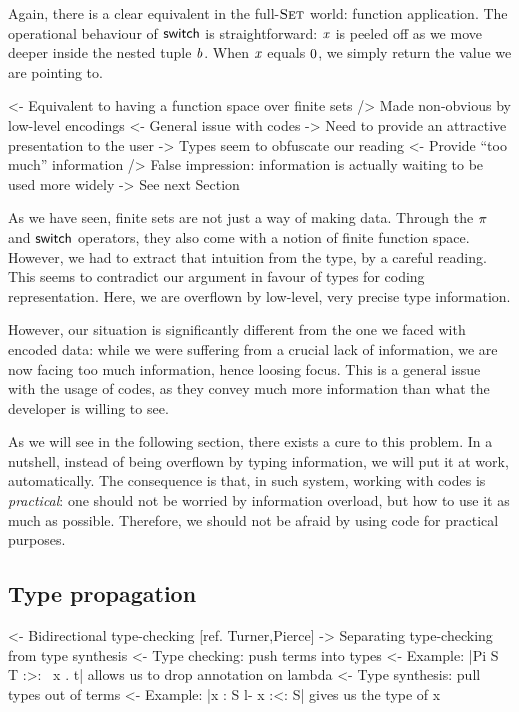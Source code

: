 Again, there is a clear equivalent in the full-$\Set$ world: function
application. The operational behaviour of $\F{switch}$ is
straightforward: $\V{x}$ is peeled off as we move deeper inside the nested
tuple $\V{b}$. When $\V{x}$ equals $\Ze$, we simply return the value we are
pointing to.

\begin{wstructure}
<- Equivalent to having a function space over finite sets
    /> Made non-obvious by low-level encodings
        <- General issue with codes
             -> Need to provide an attractive presentation to the user
    -> Types seem to obfuscate our reading
        <- Provide ``too much'' information
        /> False impression: information is actually waiting to be used more widely
        -> See next Section
\end{wstructure}

As we have seen, finite sets are not just a way of making
data. Through the $\spi{}{}$ and $\F{switch}$ operators, they also
come with a notion of finite function space. However, we had to
extract that intuition from the type, by a careful reading. This seems
to contradict our argument in favour of types for coding
representation. Here, we are overflown by low-level, very precise type
information.

However, our situation is significantly different from the one we
faced with encoded data: while we were suffering from a crucial lack
of information, we are now facing too much information, hence loosing
focus. This is a general issue with the usage of codes, as they convey
much more information than what the developer is willing to see. 

As we will see in the following section, there exists a cure to this
problem. In a nutshell, instead of being overflown by typing
information, we will put it at work, automatically. The consequence is
that, in such system, working with codes is \emph{practical}: one
should not be worried by information overload, but how to use it as
much as possible. Therefore, we should not be afraid by using code for
practical purposes.


\subsection{Type propagation}
\label{sec:type-propagation}

\begin{wstructure}
<- Bidirectional type-checking [ref. Turner,Pierce]
    -> Separating type-checking from type synthesis
    <- Type checking: push terms into types
        <- Example: |Pi S T :>: \ x . t| allows us to drop annotation on lambda
    <- Type synthesis: pull types out of terms
        <- Example: |x : S l- x :<: S| gives us the type of x
\end{wstructure}


